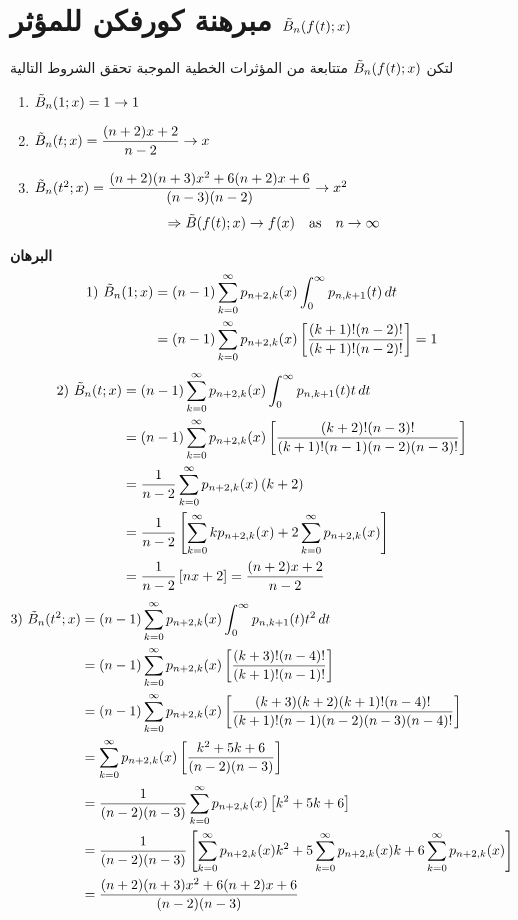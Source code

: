 \section{مبرهنة كورفكن للمؤثر $\tilde{B}_n(f(t); x)$}
لتكن $\tilde{B}_n(f(t); x)$ متتابعة من المؤثرات الخطية الموجبة  تحقق الشروط التالية
\begin{english}
	\begin{enumerate}[label=\arabic*)]
		\item $\tilde{B}_n(1; x) = 1\to 1$
		\item $\tilde{B}_n(t; x) = \dfrac{(n+2)x+2}{n-2}\to x$
		\item $\tilde{B}_n(t^2; x) = \dfrac{(n+2)(n+3)x^2 + 6(n+2)x + 6}{(n-3)(n-2)}\to x^2$
		\[
		\Rightarrow \tilde{B}(f(t); x) \to f(x)\quad \text{as}\quad n \to \infty
		\]
	\end{enumerate}
\end{english}
\noindent
\textbf{البرهان}
\begin{align*}
1)\,\,\tilde{B}_n(1; x) &= (n-1)\sum_{k=0}^{\infty} p_{n+2, k}(x) \int_{0}^{\infty} p_{n, k+1}(t)  \, dt\\
&= (n-1) \sum_{k=0}^{\infty} p_{n+2, k}(x) \left[\frac{(k+1)!(n-2)!}{(k+1)!(n-2)!}\right] = 1
\end{align*}
\begin{align*}
2)\,\,\tilde{B}_n(t; x) &= (n-1)\sum_{k=0}^{\infty} p_{n+2, k}(x) \int_{0}^{\infty} p_{n, k+1}(t)  t\, dt\\
&= (n-1)\sum_{k=0}^{\infty} p_{n+2, k}(x) \left[\frac{(k+2)!(n-3)!}{(k+1)!(n-1)(n-2)(n-3)!}\right]\\
&= \frac{1}{n-2}\sum_{k=0}^{\infty} p_{n+2, k}(x)\, (k+2)\\
&= \frac{1}{n-2}\left[\sum_{k=0}^{\infty} kp_{n+2, k}(x) + 2\sum_{k=0}^{\infty} p_{n+2, k}(x)\right]\\
&=\frac{1}{n-2}\left[nx+2\right] = \frac{(n+2)x+2}{n-2}
\end{align*}
\begin{align*}
	3) \,\,\tilde{B}_n(t^2; x) &= (n-1)\sum_{k=0}^{\infty} p_{n+2, k}(x) \int_{0}^{\infty} p_{n, k+1}(t)  t^2\, dt\\
	&= (n-1)\sum_{k=0}^{\infty} p_{n+2, k}(x) \left[\frac{(k+3)!(n-4)!}{(k+1)!(n-1)!}\right]\\
	&= (n-1)\sum_{k=0}^{\infty} p_{n+2, k}(x)  \left[\frac{(k+3)(k+2)(k+1)!(n-4)!}{(k+1)!(n-1)(n-2)(n-3)(n-4)!}\right]\\
	&= \sum_{k=0}^{\infty} p_{n+2, k}(x) \left[\frac{k^2+5k+6}{(n-2)(n-3)}\right]\\
	&= \frac{1}{(n-2)(n-3)} \sum_{k=0}^{\infty} p_{n+2, k}(x) \left[k^2+5k+6\right]\\
	&= \frac{1}{(n-2)(n-3)} \left[\sum_{k=0}^{\infty} p_{n+2, k}(x) k^2+5\sum_{k=0}^{\infty} p_{n+2, k}(x)  k + 6\sum_{k=0}^{\infty} p_{n+2, k}(x) \right]\\
&= \frac{(n+2)(n+3)x^2 + 6(n+2)x + 6}{(n-2)(n-3)}
\end{align*}